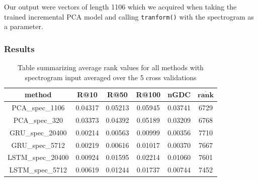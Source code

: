 Our output were vectors of length 1106 which we acquired when taking the trained incremental PCA model and calling \texttt{tranform()} with the spectrogram as a parameter.

\subsubsection{Results}

\begin{table}[h!]
\centering
\renewcommand{\arraystretch}{1.5}
\begin{tabu} to 1\textwidth { | c || c | c | c | c | c |}
 \hline
 \textbf{method} & \textbf{R@10} & \textbf{R@50} & \textbf{R@100} & \textbf{nGDC} & $ \boldsymbol{\overline{rank}} $ \\
 \hline
 \hline
 PCA\_spec\_1106 & 0.04317 & 0.05213 &  0.05945 & 0.03741 & 6729 \\
 \hline
 PCA\_spec\_320 & 0.03373 & 0.04392 &  0.05189 & 0.03209 & 6768 \\
 \hline
 GRU\_spec\_20400 & 0.00214 & 0.00563 & 0.00999 & 0.00356 & 7710 \\
 \hline
 GRU\_spec\_5712 & 0.00219 & 0.00616 & 0.01017 & 0.00370 & 7667 \\
 \hline
 LSTM\_spec\_20400 & 0.00924 & 0.01595 & 0.02214 & 0.01060 & 7601 \\
 \hline
 LSTM\_spec\_5712 & 0.00619 & 0.01244 & 0.01737 &  0.00744 & 7452 \\
 \hline
\end{tabu} \\
\caption{Table summarizing average rank values for all methods with spectrogram input averaged over the 5 cross validations}
\label{table:spec_methods}
\end{table}
 

